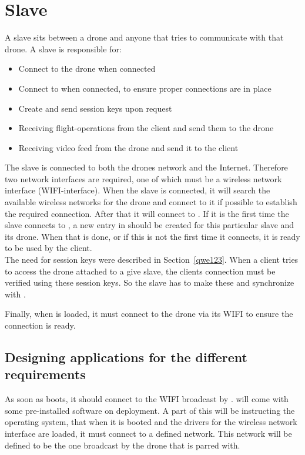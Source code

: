 \section{Slave}
\label{sec:design_slave}

A slave sits between a drone and anyone that tries to communicate with that drone. 
A slave is responsible for:

\begin{itemize}
	\item Connect to the drone when connected
	\item Connect to  when connected, to ensure proper connections are in place
	\item Create and send session keys upon request
	\item Receiving flight-operations from the client and send them to the drone
	\item Receiving video feed from the drone and send it to the client
\end{itemize}

The slave is connected to both the drones network and the Internet.
Therefore two network interfaces are required, one of which must be a wireless network interface (WIFI-interface).
When the slave is connected, it will search the available wireless networks for the drone and connect to it if possible to establish the required connection.
After that it will connect to .
If it is the first time the slave connects to , a new entry in  should be created for this particular slave and its drone.
When that is done, or if this is not the first time it connects, it is ready to be used by the client. \\

The need for session keys were described in Section~\ref{qwe123}.
When a client tries to access the drone attached to a give slave, the clients connection must be verified using these session keys.
So the slave has to make these and synchronize with .

Finally, when  is loaded, it must connect to the drone via its WIFI to ensure the connection is ready. \\

\subsection{Designing applications for the different requirements}
As soon as  boots, it should connect to the WIFI broadcast by .
 will come with some pre-installed software on deployment.
A part of this will be instructing the operating system, that when it is booted and the drivers for the wireless network interface are loaded, it must connect to a defined network.
This network will be defined to be the one broadcast by the drone that  is parred with. \\

